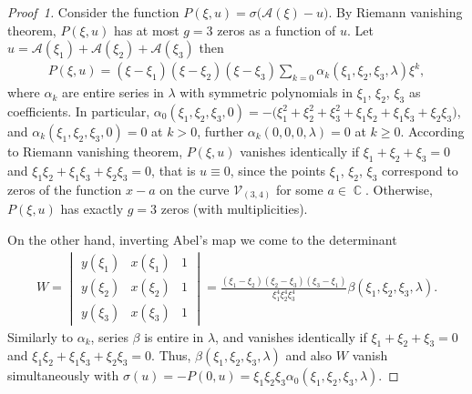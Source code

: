 \documentclass[11pt]{article}
\numberwithin{equation}{section}
\DeclareMathOperator{\Complex}{\mathbb{C}}
\begin{document}
\begin{proof}[Proof~1] Consider the function $P(\xi,u)=\sigma\bigl(\mathcal{A}(\xi)-u\bigr)$. By Riemann vanishing theorem, $P(\xi,u)$ has at most $g=3$ zeros as a function of $u$. Let $u=\mathcal{A}(\xi_1)+\mathcal{A}(\xi_2)+\mathcal{A}(\xi_3)$ then \begin{gather*}
P(\xi,u) = (\xi-\xi_1)(\xi-\xi_2)(\xi-\xi_3)\sum_{k=0} \alpha_k (\xi_1,\xi_2,\xi_3,\lambda)\xi^k,
\end{gather*}
where $\alpha_k$ are entire series in $\lambda$ with symmetric polynomials in $\xi_1$, $\xi_2$, $\xi_3$ as coefficients. In particular, $\alpha_0 (\xi_1,\xi_2,\xi_3,0) = -\big(\xi_1^2+\xi_2^2+\xi_3^2 +\xi_1 \xi_2 + \xi_1 \xi_3 + \xi_2\xi_3\big)$, and $\alpha_k(\xi_1,\xi_2,\xi_3,0)=0$ at $k>0$, further $\alpha_k(0,0,0,\lambda)=0$ at $k\geqslant 0$. According to Riemann vanishing theorem, $P(\xi,u)$ vanishes identically if $\xi_1+\xi_2+\xi_3=0$ and $\xi_1\xi_2+ \xi_1\xi_3 + \xi_2 \xi_3 = 0$, that is $u\equiv 0$, since the points $\xi_1$, $\xi_2$, $\xi_3$ correspond to zeros of the function $x-a$ on the curve $\mathcal{V}_{(3,4)}$ for some $a\in \Complex$. Otherwise, $P(\xi,u)$ has exactly $g=3$ zeros (with multiplicities).

On the other hand, inverting Abel's map we come to the determinant
\begin{gather*}
 W = \begin{vmatrix}
 y(\xi_1) & x(\xi_1) & 1 \\ y(\xi_2) & x(\xi_2) & 1\\ y(\xi_3) & x(\xi_3) & 1
 \end{vmatrix} = \frac{(\xi_1-\xi_2)(\xi_2-\xi_3)(\xi_3-\xi_1)}{\xi_1^4 \xi_2^4 \xi_3^4}
 \beta (\xi_1,\xi_2,\xi_3,\lambda).
\end{gather*}
Similarly to $\alpha_k$, series $\beta$ is entire in $\lambda$, and vanishes identically if $\xi_1+\xi_2+\xi_3=0$ and $\xi_1\xi_2+ \xi_1\xi_3 + \xi_2 \xi_3 = 0$. Thus, $\beta(\xi_1,\xi_2,\xi_3,\lambda)$ and also $W$ vanish simultaneously with $\sigma(u) = - P(0,u)= \xi_1\xi_2\xi_3 \alpha_0(\xi_1,\xi_2,\xi_3,\lambda)$.


\end{proof}
\end{document}
